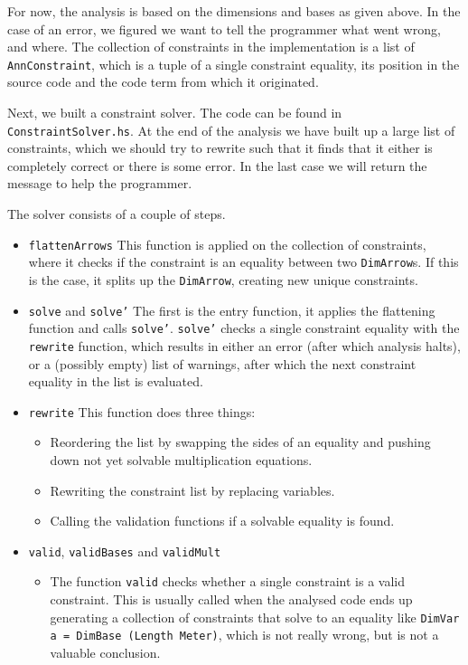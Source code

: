 \documentclass[a4paper,10pt]{article}
\begin{document}
For now, the analysis is based on the dimensions and bases as given above.
In the case of an error, we figured we want to tell the programmer what went wrong, and where.
The collection of constraints in the implementation is a list of \texttt{AnnConstraint}, which is a tuple of a single constraint equality, its position in the source code and the code term from which it originated.

Next, we built a constraint solver. The code can be found in \texttt{ConstraintSolver.hs}.
At the end of the analysis we have built up a large list of constraints, which we should try to rewrite such that it finds that it either is completely correct or there is some error.
In the last case we will return the message to help the programmer.

The solver consists of a couple of steps.
\begin{itemize}
	\item \texttt{flattenArrows} 
		This function is applied on the collection of constraints, where it checks if the constraint is an equality between two \texttt{DimArrow}s.
		If this is the case, it splits up the \texttt{DimArrow}, creating new unique constraints.
	\item \texttt{solve} and \texttt{solve'}
		The first is the entry function, it applies the flattening function and calls \texttt{solve'}. \texttt{solve'} checks a single constraint equality with the \texttt{rewrite} function, which results in either an error (after which analysis halts), or a (possibly empty) list of warnings, after which the next constraint equality in the list is evaluated.
	\item \texttt{rewrite} 
		This function does three things:
		\begin{itemize}
		\item Reordering the list by swapping the sides of an equality and pushing down not yet solvable multiplication equations.
		\item Rewriting the constraint list by replacing variables.
		\item Calling the validation functions if a solvable equality is found.
		\end{itemize}
	\item \texttt{valid}, \texttt{validBases} and \texttt{validMult} 
	\begin{itemize}
		\item The function \texttt{valid} checks whether a single constraint is a valid constraint. This is usually called when the analysed code ends up generating a collection of constraints that solve to an equality like \texttt{DimVar a = DimBase (Length Meter)}, which is not really wrong, but is not a valuable conclusion.

\end{itemize}
\end{itemize}
\end{document}
